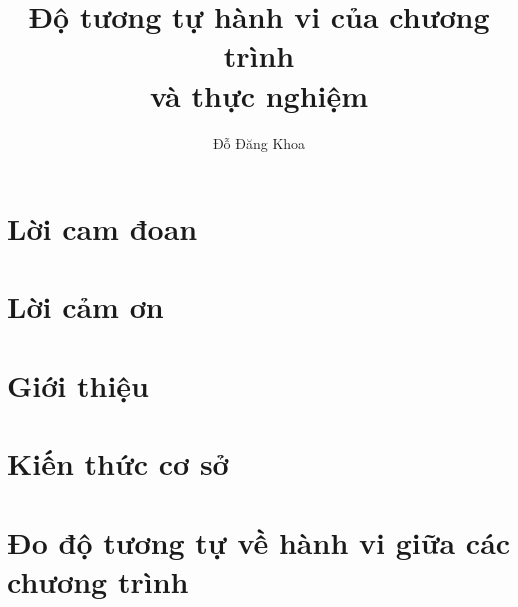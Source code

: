\documentclass[a4paper,oneside,openright]{memoir}
\title{Độ tương tự hành vi của chương trình \\và thực nghiệm}
\author{Đỗ Đăng Khoa}
\begin{document}
\maketitle{} %


\listoftodos{}

	
% 


% 
% 


\chapter*{Lời cam đoan}


\chapter*{Lời cảm ơn}



% 

\newpage
\tableofcontents


 

\chapter{Giới thiệu}


\chapter{Kiến thức cơ sở}


\chapter{Đo độ tương tự về hành vi giữa các chương trình}

\end{document}
